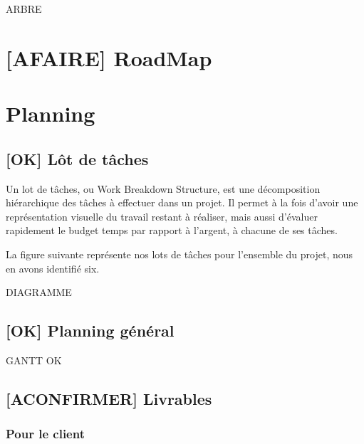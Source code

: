 \documentclass[10pt,a4paper]{article}
\begin{document}
ARBRE %

\section{[AFAIRE] RoadMap}

\section{Planning}
\label{sec:planning}

\subsection{[OK] Lôt de tâches}

Un lot de tâches, ou Work Breakdown Structure, est une décomposition hiérarchique des tâches à effectuer dans un projet. Il permet à la fois d'avoir une représentation visuelle du travail restant à réaliser, mais aussi d'évaluer rapidement le budget temps par rapport à l'argent, à chacune de ses tâches.

La figure suivante représente nos lots de tâches pour l'ensemble du projet, nous en avons identifié six.

DIAGRAMME

\subsection{[OK] Planning général}

GANTT OK %

\subsection{[ACONFIRMER] Livrables}

\subsubsection{Pour le client}
\end{document}

